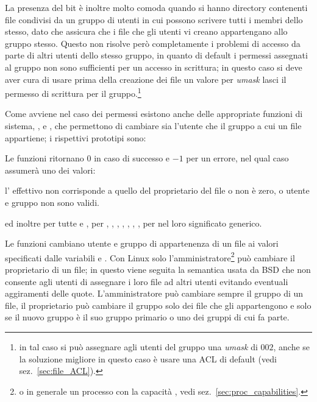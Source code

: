 La presenza del bit  è inoltre molto comoda quando si hanno
directory contenenti file condivisi da un gruppo di utenti in cui possono
scrivere tutti i membri dello stesso, dato che assicura che i file che gli
utenti vi creano appartengano allo gruppo stesso. Questo non risolve però
completamente i problemi di accesso da parte di altri utenti dello stesso
gruppo, in quanto di default i permessi assegnati al gruppo non sono
sufficienti per un accesso in scrittura; in questo caso si deve aver cura di
usare prima della creazione dei file un valore per \textit{umask} lasci il
permesso di scrittura per il gruppo.\footnote{in tal caso si può assegnare
  agli utenti del gruppo una \textit{umask} di $002$, anche se la soluzione
  migliore in questo caso è usare una ACL di default (vedi
  sez.~\ref{sec:file_ACL}).}

Come avviene nel caso dei permessi esistono anche delle appropriate funzioni
di sistema, ,  e , che permettono di
cambiare sia l'utente che il gruppo a cui un file appartiene; i rispettivi
prototipi sono:

\begin{funcproto}{
}

{Le funzioni ritornano $0$ in caso di successo e $-1$ per un errore, nel qual
  caso  assumerà uno dei valori: 
  \begin{errlist}
  \item[\errcode{EPERM}] l' effettivo non corrisponde a quello del
    proprietario del file o non è zero, o utente e gruppo non sono validi.
  \end{errlist}
  ed inoltre per tutte  e , per 
  , , , ,
  , , , per 
   nel loro significato generico.}
\end{funcproto}

Le funzioni cambiano utente e gruppo di appartenenza di un file ai valori
specificati dalle variabili  e . Con Linux solo
l'amministratore\footnote{o in generale un processo con la capacità
  , vedi sez.~\ref{sec:proc_capabilities}.} può cambiare il
proprietario di un file; in questo viene seguita la semantica usata da BSD che
non consente agli utenti di assegnare i loro file ad altri utenti evitando
eventuali aggiramenti delle quote.  L'amministratore può cambiare sempre il
gruppo di un file, il proprietario può cambiare il gruppo solo dei file che
gli appartengono e solo se il nuovo gruppo è il suo gruppo primario o uno dei
gruppi di cui fa parte.

